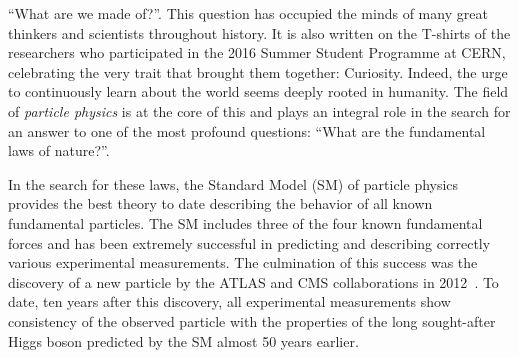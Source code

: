 
``What are we made of?''. This question has occupied the minds of many great thinkers and scientists throughout history. It is also written on the T-shirts of the researchers who participated in the 2016 Summer Student Programme at CERN, celebrating the very trait that brought them together: Curiosity. Indeed, the urge to continuously learn about the world seems deeply rooted in humanity.
The field of \emph{particle physics} is at the core of this and plays an integral role in the search for an answer to one of the most profound questions: ``What are the fundamental laws of nature?''.

In the search for these laws, the Standard Model (SM) of particle physics provides the best theory to date describing the behavior of all known fundamental particles. 
The SM includes three of the four known fundamental forces and has been extremely successful in predicting and describing correctly various experimental measurements. 
The culmination of this success was the discovery of a new particle by the ATLAS and CMS collaborations in 2012~\cite{HIGG-2012-27,CMS-HIG-12-028}.
To date, ten years after this discovery, all experimental measurements show consistency of the observed particle with the properties of the long sought-after Higgs boson predicted by the SM almost 50 years earlier.

